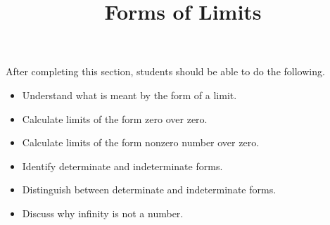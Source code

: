 \documentclass{ximera}
\title{Forms of Limits}
\begin{document}
\begin{abstract}
\end{abstract}
\maketitle

\begin{sectionOutcomes}
After completing this section, students should be able to do the following.

\begin{itemize}
\item Understand what is meant by the form of a limit.
\item Calculate limits of the form zero over zero.
\item Calculate limits of the form nonzero number over zero.
\item Identify determinate and indeterminate forms.
\item Distinguish between determinate and indeterminate forms.
\item Discuss why infinity is not a number.
\end{itemize}
\end{sectionOutcomes}
\end{document}
